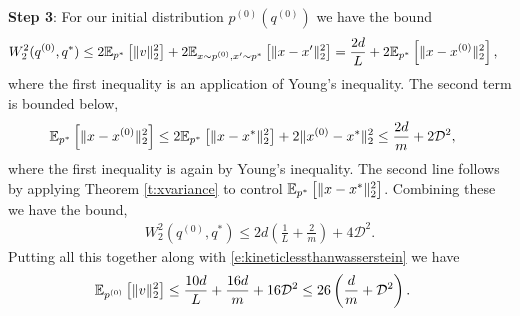 \begin{Proof}
\textbf{Step 3}: For our initial distribution $p^{(0)} (q^{(0)})$ we have the bound
\begin{align*}
W_{2}^{2}(q^{(0)},q^*) & \le 2 \mathbb{E}_{p^*} \left[ \lVert v \rVert_2^2\right] + 2 \mathbb{E}_{x \sim p^{(0)}, x' \sim p^*} \left[\lVert x-x' \rVert_2^2 \right] = \frac{2d}{L} + 2 \mathbb{E}_{p^*} \left[ \lVert x - x^{(0)} \rVert_2^2\right],
\end{align*}
where the first inequality is an application of Young's inequality. The second term is bounded below,
\begin{align*}
\mathbb{E}_{p^*} \left[ \lVert x - x^{(0)} \rVert_2^2\right] & \le 2\mathbb{E}_{p^*} \left[ \lVert x - x^* \rVert_2^2\right]+ 2\lVert x^{(0)} - x^* \rVert_2^2
\le \frac{2d}{m } + 2\mathcal{D}^2,
\end{align*}
where the first inequality is again by Young's inequality. The second line follows by applying Theorem \ref{t:xvariance} to control $\mathbb{E}_{p^*}\left[\lVert x-x^* \rVert_2^2\right]$. Combining these we have the bound,
\begin{align*}
W_{2}^{2}(q^{(0)},q^*) \le 2d\left(\frac{1}{L}+ \frac{2}{m} \right) + 4\mathcal{D}^2.
\end{align*}
Putting all this together along with \eqref{e:kineticlessthanwasserstein} we have 
\begin{align*}
\mathbb{E}_{p^{(0)}}\left[ \lVert v \rVert_2^2\right] & \le \frac{10d}{L} + \frac{16 d}{m} + 16 \mathcal{D}^2 \le 26\left(\frac{ d}{m}+  \mathcal{D}^2\right).
\end{align*}


\end{Proof}

